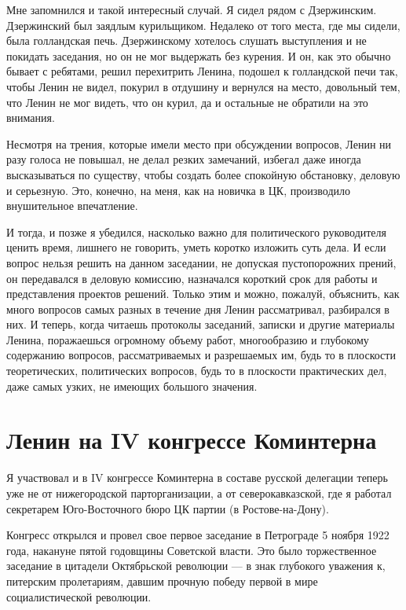 \documentclass[12pt, a4paper, openany]{book}
\begin{document}
Мне запомнился и такой интересный случай. Я сидел рядом с Дзержинским. Дзержинский был заядлым курильщиком. Недалеко от того места, где мы сидели, была голландская печь. Дзержинскому хотелось слушать выступления и не покидать заседания, но он не мог выдержать без курения. И он, как это обычно бывает с ребятами, решил перехитрить Ленина, подошел к голландской печи так, чтобы Ленин не видел, покурил в отдушину и вернулся на место, довольный тем, что Ленин не мог видеть, что он курил, да и остальные не обратили на это внимания.

Несмотря на трения, которые имели место при обсуждении вопросов, Ленин ни разу голоса не повышал, не делал резких замечаний, избегал даже иногда высказываться по существу, чтобы создать более спокойную обстановку, деловую и серьезную. Это, конечно, на меня, как на новичка в ЦК, производило внушительное впечатление.

И тогда, и позже я убедился, насколько важно для политического руководителя ценить время, лишнего не говорить, уметь коротко изложить суть дела. И если вопрос нельзя решить на данном заседании, не допуская пустопорожних прений, он передавался в деловую комиссию, назначался короткий срок для работы и представления проектов решений. Только этим и можно, пожалуй, объяснить, как много вопросов самых разных в течение дня Ленин рассматривал, разбирался в них. И теперь, когда читаешь протоколы заседаний, записки и другие материалы Ленина, поражаешься огромному объему работ, многообразию и глубокому содержанию вопросов, рассматриваемых и разрешаемых им, будь то в плоскости теоретических, политических вопросов, будь то в плоскости практических дел, даже самых узких, не имеющих большого значения.

\newpage
\section[Ленин на IV конгрессе Коминтерна]{\center \textbf{Ленин на IV конгрессе Коминтерна}}


Я участвовал и в IV конгрессе Коминтерна в составе русской делегации теперь уже не от нижегородской парторганизации, а от северокавказской, где я работал секретарем Юго-Восточного бюро ЦК партии (в Ростове-на-Дону).

Конгресс открылся и провел свое первое заседание в Петрограде 5 ноября 1922 года, накануне пятой годовщины Советской власти. Это было торжественное заседание в цитадели Октябрьской революции — в знак глубокого уважения к, питерским пролетариям, давшим прочную победу первой в мире социалистической революции.
\end{document}
